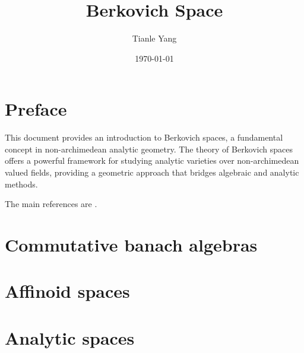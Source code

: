 \documentclass[sectionlevel=book]{noteformyself}
\title{Berkovich Space}
\author{Tianle Yang}
\date{\today}
\begin{document}
   \maketitle

   \tableofcontents %


   \chapter*{Preface}

   This document provides an introduction to Berkovich spaces, a fundamental concept in non-archimedean analytic geometry. 
   The theory of Berkovich spaces offers a powerful framework for studying analytic varieties over non-archimedean valued fields, providing a geometric approach that bridges algebraic and analytic methods.

   The main references are \cite{Ber90,BGR84}.

   \chapter{Commutative banach algebras}
      
      

   \chapter{Affinoid spaces}
      
      

   \chapter{Analytic spaces}


   \printbibliography[heading=bibintoc, title={References}] %
\end{document}
